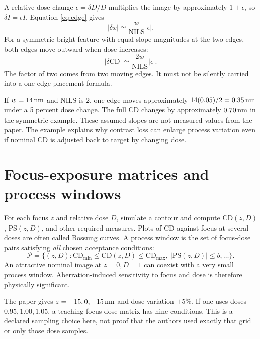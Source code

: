 A relative dose change $\epsilon=\delta D/D$ multiplies the image
by approximately $1+\epsilon$, so $\delta I=\epsilon I$.
Equation \eqref{eq:edge} gives
\begin{equation}
|\delta x|\simeq\frac{w}{\mathrm{NILS}}|\epsilon|.
\label{eq:nilsdose}
\end{equation}
For a symmetric bright feature with equal slope magnitudes at the two
edges, both edges move outward when dose increases:
\[
|\delta\mathrm{CD}|\simeq
\frac{2w}{\mathrm{NILS}}|\epsilon|.
\]
The factor of two comes from two moving edges. It must not be silently
carried into a one-edge placement formula.

If $w=14\,\mathrm{nm}$ and NILS is 2, one edge moves approximately
$14(0.05)/2=0.35\,\mathrm{nm}$ under a 5 percent dose change.
The full CD changes by approximately $0.70\,\mathrm{nm}$ in the symmetric example.
These assumed slopes are not measured values from the paper.
The example explains why contrast loss can enlarge process variation
even if nominal CD is adjusted back to target by changing dose.

\section{Focus-exposure matrices and process windows}
For each focus $z$ and relative dose $D$, simulate a contour and compute
$\mathrm{CD}(z,D)$, $\mathrm{PS}(z,D)$, and other required measures.
Plots of CD against focus at several doses are often called Bossung curves.
A process window is the set of focus-dose pairs satisfying \emph{all}
chosen acceptance conditions:
\[
\mathcal P=\{(z,D):\mathrm{CD}_{\min}\leq\mathrm{CD}(z,D)
\leq\mathrm{CD}_{\max},\ |\mathrm{PS}(z,D)|\leq b,\ldots\}.
\]
An attractive nominal image at $z=0,D=1$ can coexist with a very small
process window. Aberration-induced sensitivity to focus and dose is
therefore physically significant.

The paper gives $z=-15,0,+15\,\mathrm{nm}$ and dose variation $\pm5\%$.
If one uses doses $0.95,1.00,1.05$, a teaching focus-dose matrix has
nine conditions. This is a declared sampling choice here, not proof that
the authors used exactly that grid or only those dose samples.

